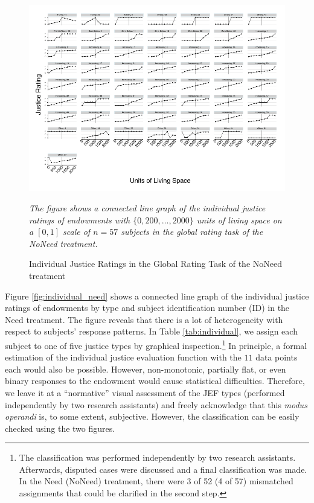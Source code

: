 \documentclass[12pt]{scrartcl}
\begin{document}
\begin{landscape}
\begin{figure}
   \centering
   \includegraphics{figures/figure_4.pdf}
   \begin{minipage}{0.7\linewidth}
      \footnotesize
      \textit{The figure shows a connected line graph of the individual justice ratings of endowments with $\{0,200,\ldots,2000\}$ units of living space on a $[0,1]$ scale of $n=57$ subjects in the global rating task of the NoNeed treatment.}
   \end{minipage}
   \caption{Individual Justice Ratings in the Global Rating Task of the NoNeed treatment}
   \label{fig:individual_noneed}
\end{figure}
\end{landscape}

Figure \ref{fig:individual_need} shows a connected line graph of the individual justice ratings of endowments by type and subject identification number (ID) in the Need treatment.
The figure reveals that there is a lot of heterogeneity with respect to subjects' response patterns.
In Table \ref{tab:individual}, we assign each subject to one of five justice types by graphical inspection.\footnote{The classification was performed independently by two research assistants. Afterwards, disputed cases were discussed and a final classification was made. In the Need (NoNeed) treatment, there were 3 of 52 (4 of 57) mismatched assignments that could be clarified in the second step.}
In principle, a formal estimation of the individual justice evaluation function with the $11$ data points each would also be possible.
However, non-monotonic, partially flat, or even binary responses to the endowment would cause statistical difficulties.
Therefore, we leave it at a ``normative'' visual assessment of the JEF types (performed independently by two research assistants) and freely acknowledge that this \textit{modus operandi} is, to some extent, subjective.
However, the classification can be easily checked using the two figures.
\end{document}
